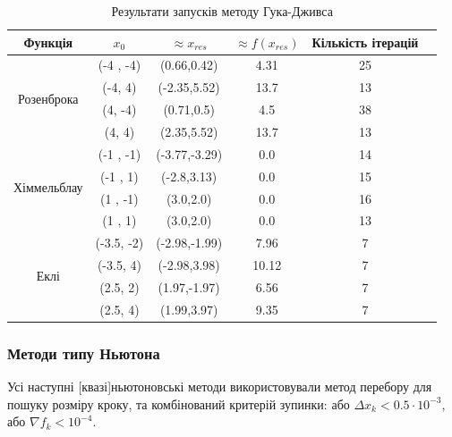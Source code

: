 \begin{table}[h!]
    \centering
    \begin{tabular}{|c|c|c|c|c|c|}
        \hline
        \textbf{Функція} & $x_0$ & $\approx x_{res}$ & $\approx f(x_{res})$ & \textbf{Кількість ітерацій}  \\
        \hline
        \multirow{4}{*}{Розенброка} & (-4 , -4) & (0.66,0.42) & 4.31 & 25 \\
        \cline{2-5}
        & (-4, 4) & (-2.35,5.52) & 13.7 & 13 \\
        \cline{2-5}
        & (4, -4) & (0.71,0.5) & 4.5 & 38 \\
        \cline{2-5}
        & (4, 4) & (2.35,5.52) & 13.7 & 13 \\
        \hline
        \multirow{4}{*}{Хіммельблау} & (-1 , -1) & (-3.77,-3.29) & 0.0 & 14 \\
        \cline{2-5}
        & (-1 , 1) & (-2.8,3.13) & 0.0 & 15 \\
        \cline{2-5}
        & (1 , -1) & (3.0,2.0) & 0.0 & 16 \\
        \cline{2-5}
        & (1 , 1) & (3.0,2.0) & 0.0 & 13 \\
        \hline
        \multirow{4}{*}{Еклі} & (-3.5, -2) & (-2.98,-1.99) & 7.96 & 7 \\
        \cline{2-5}
        & (-3.5, 4) & (-2.98,3.98) & 10.12 & 7
        \\ \cline{2-5}
        & (2.5, 2) &(1.97,-1.97) & 6.56 & 7
        \\ \cline{2-5}
        & (2.5, 4) & (1.99,3.97) & 9.35 & 7
        \\ \hline
    \end{tabular}
    \caption{Результати запусків методу Гука-Дживса}
\end{table}

\subsubsection*{Методи типу Ньютона}

Усі наступні [квазі]ньютоновські методи використовували
метод перебору для пошуку розміру кроку, та
комбінований критерій зупинки:
або $\Delta x_k < 0.5 \cdot 10^{-3}$,
або $\nabla f_k < 10^{-4}$.


